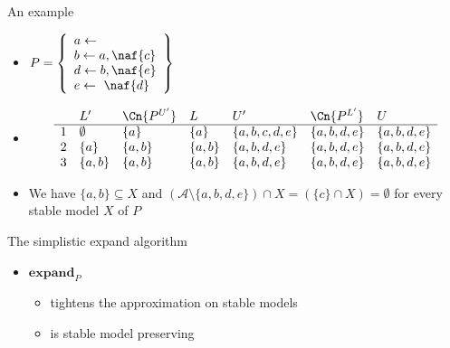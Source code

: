 \begin{frame}{An example}
\begin{itemize}
\item<1-> []
\(
P
=
\left\{
  \begin{array}{l}
    a\leftarrow\\  b\leftarrow a,\naf{c}\\ d\leftarrow b,\naf{e}\\ e\leftarrow~\naf{d}
  \end{array}
\right\}
\)
\item<2-> []
\[
\begin{array}{cllllll}
  & L'        & \Cn{P^{U'}} & L       & U'            & \Cn{P^{L'}} & U          \\
\hline
1 & \emptyset & \{a\}         & \{a\}   &\{a,b,c,d,e\}  & \{a,b,d,e\}   & \{a,b,d,e\}\\
2 & \{a\}     & \{a,b\}       & \{a,b\} &\{a,b,d,e\}    & \{a,b,d,e\}   & \{a,b,d,e\}\\
3 & \{a,b\}   & \{a,b\}       & \{a,b\} & \{a,b,d,e\}   & \{a,b,d,e\}   & \{a,b,d,e\}\\
\end{array}
\]
\medskip
\item<3->  We have $\{a,b\}\subseteq X$ and
  $(\mathcal{A}\setminus\{a,b,d,e\})\cap X= (\{c\}\cap X)=\emptyset$
  for every stable model $X$ of $P$
\end{itemize}
\end{frame}
\begin{frame}{The simplistic expand algorithm}
  \bigskip
  \begin{itemize}
  \item $\mathbf{expand}_{P}$
  \begin{itemize}
  \item tightens the approximation on stable models
  \item is stable model preserving
  \end{itemize}
\end{itemize}
\end{frame}
